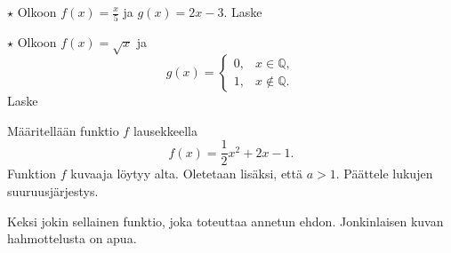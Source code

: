 \begin{tehtavasivu}
\begin{tehtava}$\star$
  Olkoon $f(x)=\frac{x}{5}$ ja $g(x)=2x-3$. Laske
  \begin{vastaus}
  \end{vastaus}
\end{tehtava}

\begin{tehtava}$\star$ %
	Olkoon $f(x) =\sqrt{x} $ ja 
	\begin{equation*}
	g(x)=
		\begin{cases}
		  0, & x \in \mathbb{Q},\\
		  1, & x \notin \mathbb{Q}.
		\end{cases}
	\end{equation*}
	Laske
	
    \begin{vastaus}
    \end{vastaus}
\end{tehtava}

\begin{tehtava}
	Määritellään funktio $f$ lausekkeella \[f(x)=\frac{1}{2}x^2+2x-1.\] Funktion $f$ kuvaaja löytyy alta. Oletetaan lisäksi, että $a>1$. Päättele lukujen suuruusjärjestys.
	\begin{center}
	\begin{kuvaajapohja}{0.7}{-3}{7}{-5}{3}
	\end{kuvaajapohja}
\end{center}
    \begin{vastaus}
    \end{vastaus}
\end{tehtava}

\begin{tehtava} Keksi jokin sellainen funktio, joka toteuttaa annetun ehdon. Jonkinlaisen kuvan hahmottelusta on apua.
    \begin{vastaus}
    \end{vastaus}
\end{tehtava}

\end{tehtavasivu}